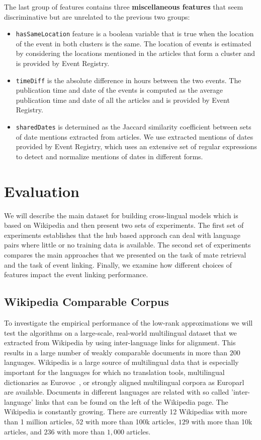 \documentclass[twoside,11pt]{article}
\begin{document}
The last group of features contains three {\bf miscellaneous features} that seem discriminative but are unrelated to the previous two groups:
\begin{itemize}
\item \texttt{hasSameLocation} feature is a boolean variable that is true when the location of the event in both clusters is the same. The location of events is estimated by considering the locations mentioned in the articles that form a cluster and is provided by Event Registry.
\item \texttt{timeDiff} is the absolute difference in hours between the two events. The publication time and date of the events is computed as the average publication time and date of all the articles and is provided by Event Registry.
\item \texttt{sharedDates} is determined as the Jaccard similarity coefficient between sets of date mentions extracted from articles. We use extracted mentions of dates provided by Event Registry, which uses an extensive set of regular expressions to detect and normalize mentions of dates in different forms.
\end{itemize}


\section{Evaluation}\label{sec:evaluation}

We will describe the main dataset for building cross-lingual models which is based on Wikipedia and then present two sets of experiments. The first set of experiments
establishes that the hub based approach can deal with language pairs where little or no training data is available. The second set of experiments compares the main approaches
that we presented on the task of mate retrieval and the task of event linking. Finally, we examine how different choices of features impact the event linking performance.

\subsection{Wikipedia Comparable Corpus}

To investigate the empirical performance of the low-rank approximations we will test the algorithms on a large-scale, real-world multilingual dataset that we extracted from Wikipedia by using inter-language links for alignment. This  results in a large number of weakly comparable documents in more than $200$ languages. Wikipedia is a large source of multilingual data that is especially important for the languages for which no translation tools, multilingual dictionaries as Eurovoc~\cite{eurovoc}, or strongly aligned multilingual corpora as Europarl~\cite{europarl} are available. Documents in different languages are related with so called 'inter-language' links that can be found on the left of the Wikipedia page. The Wikipedia is constantly growing. There are currently 12 Wikipedias with more than 1 million %
 articles, $52$ with more than 100k %
 articles, $129$ with more than 10k articles, and $236$ with more than $1,000$ articles.
\end{document}
